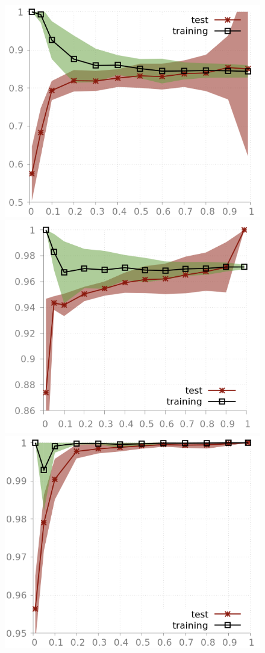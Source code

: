 \documentclass[preprint,12pt]{elsarticle}
\theoremstyle{definition}
\begin{document}
\begin{figure}[!h]
\centering
\includegraphics[scale=0.3]{img/learning_curve_heart.png}
\hfill
\includegraphics[scale=0.3]{img/learning_curve_breast.png}
\includegraphics[scale=0.3]{img/learning_curve_mushrooms.png}

\end{figure}
\end{document}
